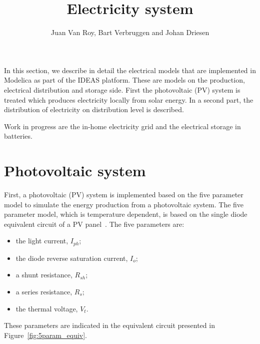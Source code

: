 
\title{Electricity system}
\author{Juan Van Roy, Bart Verbruggen and Johan Driesen}
\maketitle


\vspace{\baselineskip}

In this section, we describe in detail the electrical models that are implemented in Modelica as part of the IDEAS platform. These are models on the production, electrical distribution and storage side. First the photovoltaic (PV) system is treated which produces electricity locally from solar energy. In a second part, the distribution of electricity on distribution level is described.

Work in progress are the in-home electricity grid and the electrical storage in batteries.

\section{Photovoltaic system}
First, a photovoltaic (PV) system is implemented based on the five parameter model to simulate the energy production from a photovoltaic system. The five parameter model, which is temperature dependent, is based on the single diode equivalent circuit of a PV panel~\cite{desoto,sera}. The five parameters are:
\begin{itemize}
\item the light current, $I_{ph}$;
\item the diode reverse saturation current, $I_{o}$;
\item a shunt resistance, $R_{sh}$;
\item a series resistance, $R_{s}$;
\item the thermal voltage, $V_{t}$.
\end{itemize} 
These parameters are indicated in the equivalent circuit presented in Figure~\ref{fig:5param_equiv}.

